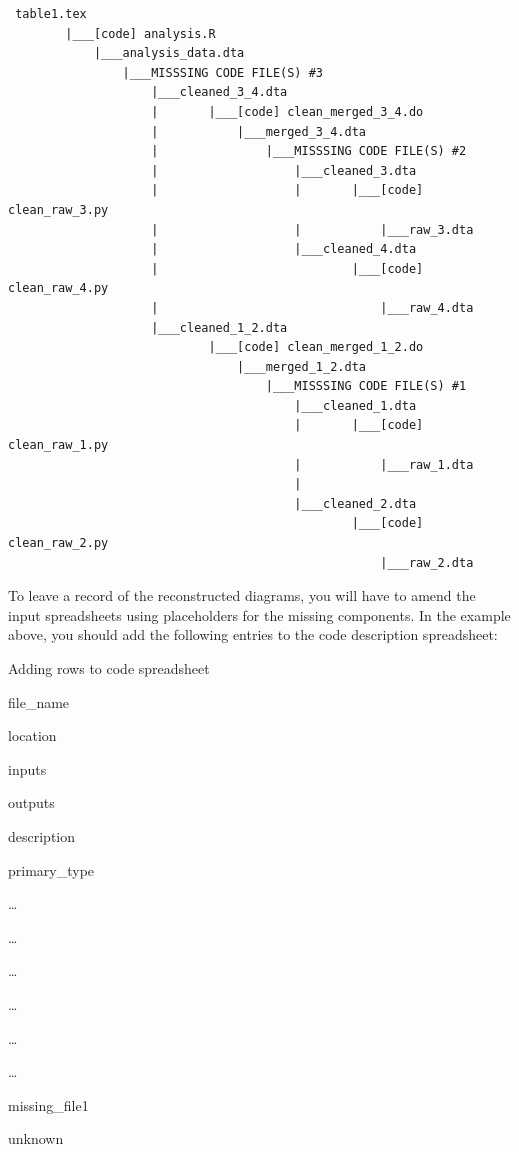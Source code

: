 \documentclass[]{book}
\begin{document}
\begin{verbatim}
 table1.tex
        |___[code] analysis.R
            |___analysis_data.dta
                |___MISSSING CODE FILE(S) #3
                    |___cleaned_3_4.dta
                    |       |___[code] clean_merged_3_4.do
                    |           |___merged_3_4.dta
                    |               |___MISSSING CODE FILE(S) #2
                    |                   |___cleaned_3.dta
                    |                   |       |___[code] clean_raw_3.py
                    |                   |           |___raw_3.dta    
                    |                   |___cleaned_4.dta
                    |                           |___[code] clean_raw_4.py
                    |                               |___raw_4.dta
                    |___cleaned_1_2.dta
                            |___[code] clean_merged_1_2.do
                                |___merged_1_2.dta
                                    |___MISSSING CODE FILE(S) #1
                                        |___cleaned_1.dta
                                        |       |___[code] clean_raw_1.py
                                        |           |___raw_1.dta
                                        |   
                                        |___cleaned_2.dta
                                                |___[code] clean_raw_2.py
                                                    |___raw_2.dta
\end{verbatim}

To leave a record of the reconstructed diagrams, you will have to amend the input spreadsheets using placeholders for the missing components. In the example above, you should add the following entries to the code description spreadsheet:

\label{tab:adding-rows}Adding rows to code spreadsheet

file\_name

location

inputs

outputs

description

primary\_type

\ldots{}

\ldots{}

\ldots{}

\ldots{}

\ldots{}

\ldots{}

missing\_file1

unknown
\end{document}
